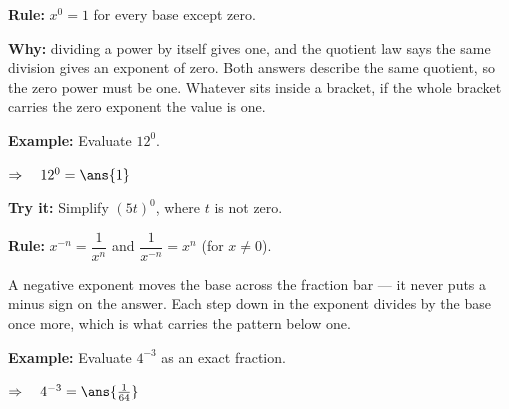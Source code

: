 \documentclass[12pt]{article}
\begin{document}


\begin{formulabox}
\textbf{Rule:} $x^0 = 1$ for every base except zero.
\par\smallskip
\textbf{Why:} dividing a power by itself gives one, and the quotient law says the same
division gives an exponent of zero. Both answers describe the same quotient, so the zero
power must be one. Whatever sits inside a bracket, if the whole bracket carries the zero
exponent the value is one.
\end{formulabox}

\begin{examplebox}
\textbf{Example:} \quad Evaluate $12^0$.

$\Rightarrow\quad 12^0 = \ans{1}$
\end{examplebox}

\begin{tryitbox}
\textbf{Try it:} \quad Simplify $(5t)^0$, where $t$ is not zero.\\[2pt]
\end{tryitbox}


\begin{formulabox}
\textbf{Rule:} \quad $x^{-n} = \dfrac{1}{x^n}$ \quad and \quad
$\dfrac{1}{x^{-n}} = x^n$ \quad (for $x \neq 0$).
\par\smallskip
A negative exponent moves the base across the fraction bar --- it never puts a minus sign
on the answer. Each step down in the exponent divides by the base once more, which is what
carries the pattern below one.
\end{formulabox}

\begin{examplebox}
\textbf{Example:} \quad Evaluate $4^{-3}$ as an exact fraction.

$\Rightarrow\quad 4^{-3} = \ans{\tfrac{1}{64}}$
\end{examplebox}
\end{document}
